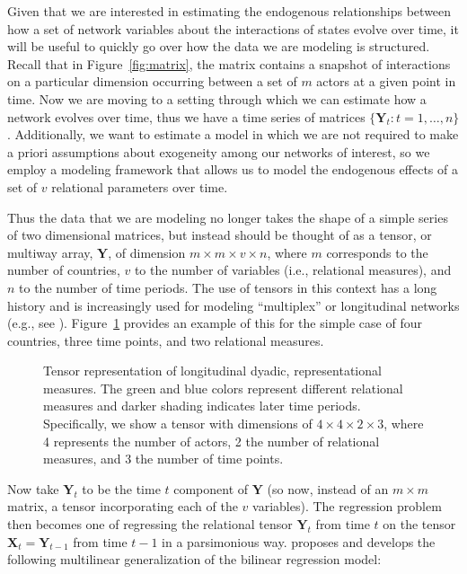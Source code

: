 \documentclass[3p,times,twocolumn,authoryear,12pt]{elsarticle}
\newcommand{\bl}[1]{{\mathbf #1}}
\begin{document}
Given that we are interested in estimating the endogenous relationships between how a set of network variables about the interactions of states evolve over time, it will be useful to quickly go over how the data we are modeling is structured. Recall that in Figure~\ref{fig:matrix}, the matrix contains a snapshot of interactions on a particular dimension occurring between a set of $m$ actors at a given point in time. Now we are moving to a setting through which we can estimate how a network evolves over time, thus we have a time series of matrices $\{{\bl Y}_t : t = 1, \ldots, n\}$. Additionally, we want to estimate a model in which we are not required to make a priori assumptions about exogeneity among our networks of interest, so we employ a modeling framework that allows us to model the endogenous effects of a set of $v$ relational parameters over time. 

Thus the data that we are modeling no longer takes the shape of a simple series of two dimensional matrices, but instead should be thought of as a tensor, or multiway array, $\bl Y$, of dimension $m \times m \times v \times n$, where $m$ corresponds to the number of countries, $v$ to the number of variables (i.e., relational measures), and $n$ to the number of time periods. The use of tensors in this context has a long history and is increasingly used for modeling ``multiplex'' or longitudinal networks (e.g., see \citealp{mucha:etal:2010, dunlavy:etal:2011}). Figure~\ref{fig:tensViz} provides an example of this for the simple case of four countries, three time points, and two relational measures. 

\begin{figure}[ht]
	\centering
	\resizebox{.5\textwidth}{!}{}
	\caption{Tensor representation of longitudinal dyadic, representational measures. The green and blue colors represent different relational measures and darker shading indicates later time periods. Specifically, we show a tensor with dimensions of $4 \times 4 \times 2 \times 3$, where 4 represents the number of actors, 2 the number of relational measures, and 3 the number of time points.}
	\label{fig:tensViz}
\end{figure}

Now take $\bl Y_t$ to be the time $t$ component of $\bl Y$ (so now, instead of an $m\times m$ matrix, a tensor incorporating each of the $v$ variables). The regression problem then becomes one of regressing the relational tensor $\bl Y_t$ from time $t$ on the tensor $\bl X_t =\bl Y_{t-1}$ from time $t-1$ in a parsimonious way. \citet{hoff:2015} proposes and develops the following multilinear generalization of the bilinear regression model: 
\end{document}
